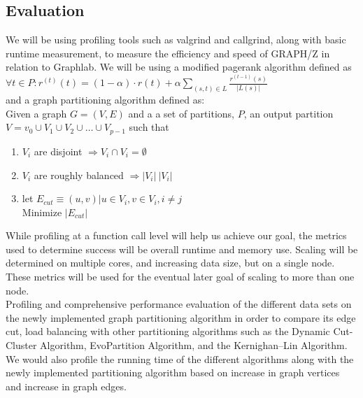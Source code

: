 \documentclass[10pt]{article}
\begin{document}
\begin{multicols}{2}
  \section{Evaluation}
  We will be using profiling tools such as valgrind and callgrind, along with basic runtime measurement, to measure the efficiency and speed of GRAPH/Z in relation to Graphlab. We will be using a modified pagerank algorithm defined as \\
  $\forall t \in P : r^{(t)}(t)  = (1-\alpha) \cdot r(t) + \alpha \sum_{(s,t) \in L} \frac{r^{(t-1)}(s)}{|L(s)|}$\\ 
  and a graph partitioning algorithm defined as:\\
  Given a graph $G = (V,E)$ and a a set of partitions, $P$, an output partition $V = v_0 \cup V_1 \cup V_2 \cup \ldots \cup V_{p-1}$ such that
  \begin{enumerate}
  \item ${V_i}$ are disjoint $\Rightarrow V_i \cap V_i = \emptyset$
  \item ${V_i}$ are roughly balanced $\Rightarrow |V_i| ~ |V_i|$
  \item let $E_{cut} \equiv {(u,v) | u \in V_i, v \in V_i, i \neq j}$\\
    Minimize $|E_{cut}|$
  \end{enumerate}
  While profiling at a function call level will help us achieve our goal, the metrics used to determine success will be overall runtime and memory use. Scaling will be determined on multiple cores, and increasing data size, but on a single node.  These metrics will be used for the eventual later goal of scaling to more than one node.\\
  Profiling and comprehensive performance evaluation of the different data sets on the newly implemented graph partitioning algorithm in order to compare its edge cut, load balancing with other partitioning algorithms such as the Dynamic Cut-Cluster Algorithm, EvoPartition Algorithm, and the Kernighan–Lin Algorithm. We would also profile the running time of the different algorithms along with the newly implemented partitioning algorithm based on increase in graph vertices and increase in graph edges.
\end{multicols}
\end{document}
